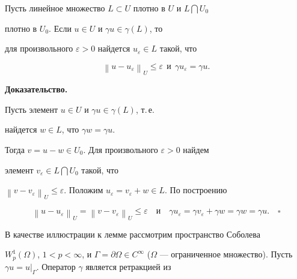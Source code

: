 \begin{lems} \label{denseps}


Пусть линейное множество $L \subset U$ плотно в $U$ и $L \bigcap U_0$


плотно в $U_0$. Если $u \in U$ и $\gamma u \in \gamma(L)$, то


для произвольного $\varepsilon > 0$ найдется $u_\varepsilon \in L$ такой, что


$$


{\left\| {u-u_\varepsilon } \right\|}_{U}


\le \varepsilon \ \ \text{и}\ \ \gamma u_\varepsilon


=\gamma u.


$$


\end{lems}





{\bf Доказательство.} 


Пусть элемент $u \in U$ и $\gamma u \in \gamma(L)$, т.\,е.


найдется $w \in L$, что $\gamma w=\gamma u$.


Тогда $v=u-w \in U_0$. Для произвольного $\varepsilon > 0$ найдем


элемент $v_\varepsilon \in L \bigcap U_0$ такой, что


${\left\| {v-v_\varepsilon } \right\|}_U \le


\varepsilon$. Положим $u_\varepsilon=v_\varepsilon+w \in L$. По построению


$$


{\left\| {u-u_\varepsilon} \right\|}_U=


{\left\| {v-v_\varepsilon } \right\|}_U \le \varepsilon \quad


\text{и} \quad \gamma u_\varepsilon=\gamma v_\varepsilon +


\gamma w=\gamma w=\gamma u.\quad\square


$$


\medskip





В качестве иллюстрации к лемме рассмотрим пространство Соболева


$W_p^1(\Omega)$, $1<p<\infty$, и $\Gamma=\partial \Omega \in


C^\infty$ ($\Omega$ --- ограниченное множество). Пусть $\gamma u =


u|_{\Gamma}$. Оператор $\gamma$ является ретракцией из



